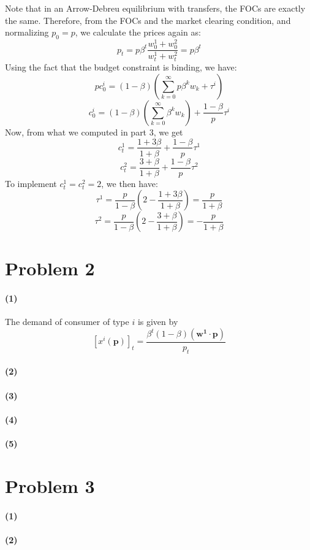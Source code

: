 \documentclass[10pt,letter]{article}
\renewcommand{\vector}[1]{\boldsymbol{#1}}
\newcommand{\problem}[1]{\section*{Problem #1}}
\newcommand{\problempart}[1]{\paragraph{#1}}
\begin{document}
Note that in an Arrow-Debreu equilibrium with transfers, the FOCs are exactly the same. Therefore, from the FOCs and the market clearing condition, and normalizing $p_0 = p$, we calculate the prices again as:
\[ p_t = p\beta^t \frac{w^1_0 + w^2_0}{w^1_t + w^2_t} = p\beta^t \]
Using the fact that the budget constraint is binding, we have:
\[ p c^i_0 = (1-\beta)\left(\sum_{k=0}^\infty p \beta^k w_k + \tau^i \right) \]
\[ c^i_0 = (1-\beta)\left(\sum_{k=0}^\infty \beta^k w_k \right) +\frac{1-\beta}{p} \tau^i  \]
Now, from what we computed in part 3, we get
\[ c^1_t = \frac{1 + 3\beta}{1 + \beta} +\frac{1-\beta}{p} \tau^1 \]
\[ c^2_t = \frac{3 + \beta}{1 + \beta} +\frac{1-\beta}{p} \tau^2 \]
To implement $c^1_t =  c^2_t = 2$, we then have:
\[ \tau^1 = \frac{p}{1-\beta}\left(2 - \frac{1+3\beta}{1+\beta} \right) = \frac{p}{1+\beta} \]
\[ \tau^2 = \frac{p}{1-\beta}\left(2 - \frac{3+\beta}{1+\beta} \right) = -\frac{p}{1+\beta} \]
\problem{2}
\problempart{(1)}
The demand of consumer of type $i$ is given by
\[ [x^i(\vector{p})]_t = \frac{\beta^t(1-\beta)(\vector{w^1} \cdot \vector{p})}{p_t} \]
\problempart{(2)}
\problempart{(3)}
\problempart{(4)}
\problempart{(5)}

\problem{3}
\problempart{(1)}
\problempart{(2)}
\end{document}

